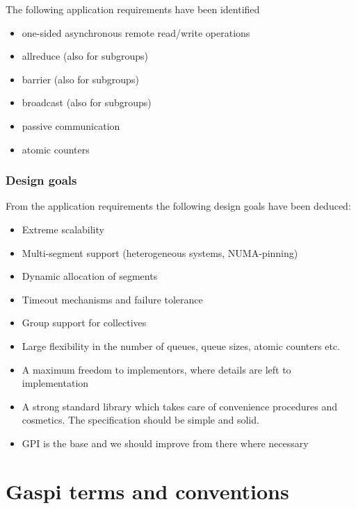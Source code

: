 \documentclass[a4paper]{article}
\newlength{\st}\setlength{\st}{0pt}
\newcommand{\GASPI}{{\sc Gaspi}}
\begin{document}
The following application requirements have been identified

\begin{itemize}
\item one-sided asynchronous remote read/write operations
\item allreduce (also for subgroups)
\item barrier (also for subgroups)
\item broadcast (also for subgroups)
\item passive communication
\item atomic counters
\end{itemize}


\subsubsection{Design goals}

From the application requirements the following design goals have been deduced:

\begin{itemize}
\item Extreme scalability
\item Multi-segment support (heterogeneous systems, NUMA-pinning)
\item Dynamic allocation of segments
\item Timeout mechanisms and failure tolerance
\item Group support for collectives
\item Large flexibility in the number of queues, queue sizes,
  atomic counters etc.
\item A maximum freedom to implementors, where details are left to
  implementation
\item A strong standard library which takes care of convenience
  procedures and cosmetics. The specification should be simple and solid.
\item GPI is the base and we should improve from there where necessary
\end{itemize}


\section{\GASPI{} terms and conventions}
\end{document}
